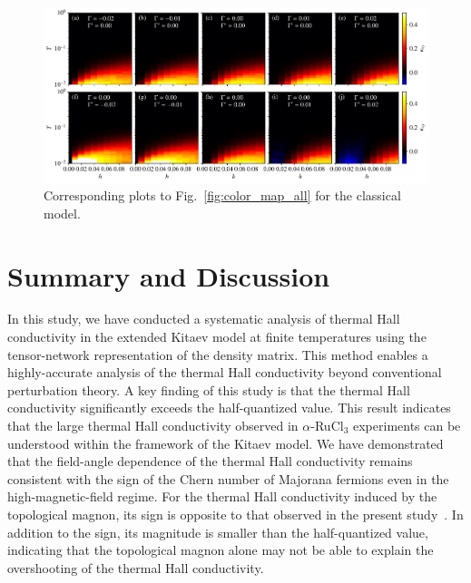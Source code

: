 \documentclass[twocolumn,superscriptaddress,showpacs, longbibliography, aps, prb]{revtex4-2}
\newcommand{\red}[1]{\textcolor{red}{#1}}
\newcommand{\blue}[1]{\textcolor{blue}{#1}}
\begin{document}
\begin{figure}
  \begin{center}
    \includegraphics[width=\linewidth]{Figs/fig_cmap_classical.pdf}
  \end{center}
  \caption{
   Corresponding plots to Fig.~\ref{fig:color_map_all} for the classical model.
   }
  \label{fig:cmap_classical}
\end{figure}

\section{Summary and Discussion}
\label{sec:Summary}
In this study, we %
have conducted a systematic analysis of thermal Hall conductivity 
in the extended Kitaev model at finite temperatures using the tensor-network 
representation of the density matrix. 
This method enables %
a highly-accurate analysis of the
thermal Hall conductivity beyond %
conventional perturbation theory. 
A key finding of this study is that the thermal Hall conductivity %
significantly exceeds the half-quantized value. 
This result indicates that the large thermal Hall conductivity observed in $\alpha$-RuCl$_3$ experiments 
can be %
understood within the framework of the Kitaev model. 
We have demonstrated that the field-angle dependence of the thermal Hall conductivity remains consistent with the sign of the Chern number 
of Majorana fermions even in the high-magnetic-field regime.
For the thermal Hall conductivity induced by the topological magnon, %
its sign is opposite to %
that observed in the present study~\cite{McClarty_PRB2018}. 
In %
addition to the sign, its magnitude is smaller than the half-quantized value, indicating that the %
topological magnon alone may %
not be able to explain the overshooting of the thermal Hall conductivity.
\end{document}
